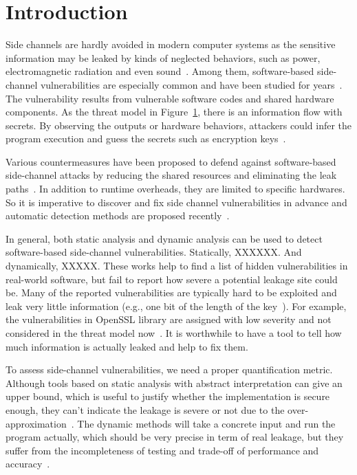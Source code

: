 \section{Introduction}
Side channels are hardly avoided in modern computer systems as the sensitive information 
may be leaked by kinds of neglected behaviors, 
such as power, electromagnetic radiation and even sound~\cite{}. 
Among them, software-based side-channel vulnerabilities are especially common and have been studied for years~\cite{}. 
The vulnerability results from vulnerable software codes and shared hardware components.
As the threat model in Figure~\ref{}, there is an information flow with secrets.  
By observing the outputs or hardware behaviors, attackers could 
infer the program execution and guess the secrets such as encryption keys~\cite{}.

Various countermeasures have been proposed to defend against 
software-based side-channel attacks by reducing the shared resources
and eliminating the leak paths~\cite{182946,203878,217537}. 
In addition to runtime overheads, they are limited to specific hardwares. 
So it is imperative to discover and fix side channel vulnerabilities in advance 
and automatic detection methods are proposed recently~\cite{}.

In general, both static analysis and dynamic analysis
can be used to detect software-based side-channel vulnerabilities.
Statically, XXXXXX. And dynamically, XXXXX.
These works help to find a list of hidden vulnerabilities in real-world software, 
but fail to report how severe a potential leakage site could be. 
Many of the reported vulnerabilities are typically hard to be exploited 
and leak very little information (e.g., one bit of the length of the key~\cite{203878}).  
For example, the vulnerabilities in OpenSSL library are assigned with low severity and not considered 
in the threat model now~\cite{https://www.openssl.org/policies/secpolicy.html}. 
It is worthwhile to have a tool to tell how much information is actually leaked and help to fix them.

To assess side-channel vulnerabilities, we need a proper quantification metric.
Although tools based on static analysis with abstract interpretation can give an upper bound, 
which is useful to justify whether the implementation is secure enough, 
they can’t indicate the leakage is severe or not due to the over-approximation~\cite{}. 
The dynamic methods will take a concrete input and run the program actually, which should be very precise in term of real leakage,
but they suffer from the incompleteness of testing and trade-off of performance and accuracy~\cite{}. 

